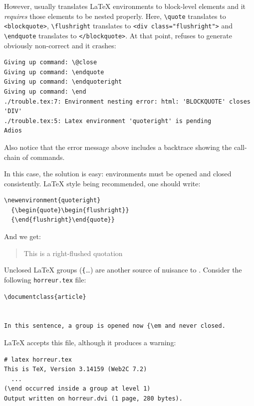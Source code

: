 However,  \hevea{} usually translates \LaTeX{} environments  to \html{}
block-level elements and it \emph{requires}
those elements to be nested properly.
Here, \verb+\quote+ translates to \verb+<blockquote>+,
\verb+\flushright+ translates to \verb+<div class="flushright">+ and
\verb+\endquote+ translates to \verb+</blockquote>+.
At that point, \hevea{} refuses to generate obviously
non-correct {\html} and it crashes:
\begin{verbatim}
Giving up command: \@close
Giving up command: \endquote
Giving up command: \endquoteright
Giving up command: \end
./trouble.tex:7: Environment nesting error: html: 'BLOCKQUOTE' closes 'DIV'
./trouble.tex:5: Latex environment 'quoteright' is pending
Adios
\end{verbatim}
Also notice that the error message above includes a backtrace showing
the call-chain of commands.

In this case, the solution is easy: environments must be opened and
closed consistently. \LaTeX{} style being recommended, one should write:
\begin{verbatim}
\newenvironment{quoteright}
  {\begin{quote}\begin{flushright}}
  {\end{flushright}\end{quote}}
\end{verbatim}
And we get:
\begin{htmlout}\newenvironment{quoteright}{\begin{quote}\begin{flushright}}{\end{flushright}\end{quote}}
\begin{htmlonly}
\begin{quoteright}
This is a right-flushed quotation
\end{quoteright}
\end{htmlonly}
\end{htmlout}


Unclosed \LaTeX{} groups (\verb+{+\ldots{}) are another source
of nuisance to \hevea{}.
Consider the following \texttt{horreur.tex} file:
\begin{verbatim}
\documentclass{article}


In this sentence, a group is opened now {\em and never closed.

\end{verbatim}
\LaTeX{} accepts this file, although it produces a warning:
\begin{verbatim}
# latex horreur.tex 
This is TeX, Version 3.14159 (Web2C 7.2)
  ...
(\end occurred inside a group at level 1)
Output written on horreur.dvi (1 page, 280 bytes).

\end{verbatim}

